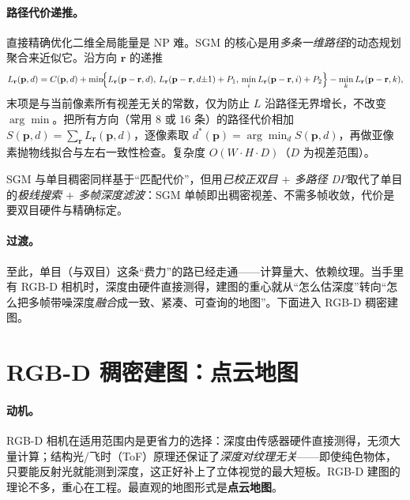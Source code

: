 \paragraph{路径代价递推。}
直接精确优化二维全局能量是 NP 难。SGM 的核心是用\emph{多条一维路径}的动态规划聚合来近似它。沿方向 $\mathbf{r}$ 的递推
\begin{equation}
  L_{\mathbf{r}}(\mathbf{p},d)=C(\mathbf{p},d)+\min\!\Bigl\{
   L_{\mathbf{r}}(\mathbf{p}-\mathbf{r},d),\,
   L_{\mathbf{r}}(\mathbf{p}-\mathbf{r},d{\pm}1)+P_1,\,
   \min_i L_{\mathbf{r}}(\mathbf{p}-\mathbf{r},i)+P_2\Bigr\}
   -\min_k L_{\mathbf{r}}(\mathbf{p}-\mathbf{r},k),
  \label{eq:dense-sgm-path}
\end{equation}
末项是与当前像素所有视差无关的常数，仅为防止 $L$ 沿路径无界增长，不改变 $\arg\min$。把所有方向（常用 8 或 16 条）的路径代价相加 $S(\mathbf{p},d)=\sum_{\mathbf{r}}L_{\mathbf{r}}(\mathbf{p},d)$，逐像素取 $d^*(\mathbf{p})=\arg\min_d S(\mathbf{p},d)$，再做亚像素抛物线拟合与左右一致性检查。复杂度 $O(W\cdot H\cdot D)$（$D$ 为视差范围）。

\begin{insight}
SGM 与单目稠密同样基于“匹配代价”，但用\emph{已校正双目 $+$ 多路径 DP}取代了单目的\emph{极线搜索 $+$ 多帧深度滤波}：SGM 单帧即出稠密视差、不需多帧收敛，代价是要双目硬件与精确标定。
\end{insight}

\paragraph{过渡。}
至此，单目（与双目）这条“费力”的路已经走通——计算量大、依赖纹理。当手里有 RGB-D 相机时，深度由硬件直接测得，建图的重心就从“怎么估深度”转向“怎么把多帧带噪深度\emph{融合}成一致、紧凑、可查询的地图”。下面进入 RGB-D 稠密建图。

\section{RGB-D 稠密建图：点云地图}
\label{sec:dense-rgbd-pc}

\paragraph{动机。}
RGB-D 相机在适用范围内是更省力的选择：深度由传感器硬件直接测得，无须大量计算；结构光/飞时（ToF）原理还保证了\emph{深度对纹理无关}——即使纯色物体，只要能反射光就能测到深度，这正好补上了立体视觉的最大短板\cite{gaoxiang2019slam14}。RGB-D 建图的理论不多，重心在工程。最直观的地图形式是\textbf{点云地图}。

